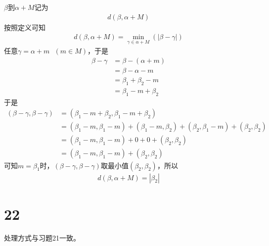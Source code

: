 \documentclass{article}
\begin{document}
$\beta$到$\alpha + M$记为
\begin{align*}
  d(\beta, \alpha + M)
\end{align*}
按照定义可知
\begin{align*}
  d(\beta, \alpha + M) = \min\limits_{\gamma \in \alpha + M} (|\beta - \gamma|)
\end{align*}
任意$\gamma = \alpha + m \ \ \ (m \in M)$，于是
\begin{align*}
  \beta - \gamma & = \beta - (\alpha + m)  \\
                 & = \beta - \alpha - m    \\
                 & = \beta_1 + \beta_2 - m \\
                 & = \beta_1 - m + \beta_2
\end{align*}
于是
\begin{align*}
  (\beta - \gamma, \beta - \gamma) & = (\beta_1 - m + \beta_2, \beta_1 - m + \beta_2)                                                    \\
                                   & = (\beta_1 - m, \beta_1 - m) + (\beta_1 - m, \beta_2) + (\beta_2, \beta_1 - m) + (\beta_2, \beta_2) \\
                                   & = (\beta_1 - m, \beta_1 - m) + 0 + 0 + (\beta_2, \beta_2)                                           \\
                                   & = (\beta_1 - m, \beta_1 - m) + (\beta_2, \beta_2)
\end{align*}
可知$m = \beta_1$时，$(\beta - \gamma, \beta - \gamma)$取最小值$(\beta_2, \beta_2)$，所以
\begin{align*}
  d(\beta, \alpha + M) = |\beta_2|
\end{align*}

\section*{22}

处理方式与习题21一致。
\end{document}
